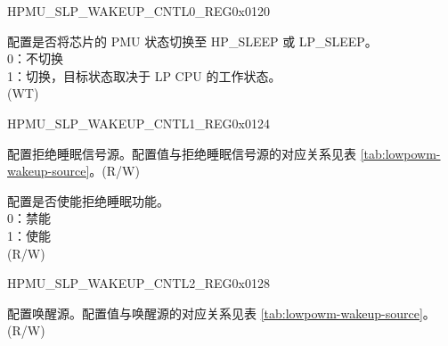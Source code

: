 \begin{register}{H}{PMU\_SLP\_WAKEUP\_CNTL0\_REG}{0x0120}\label{regdesc:PMUSLPWAKEUPCNTL0REG}
%
%
\regnewline%
\begin{regdesc}\begin{reglist}
\label{fielddesc:PMUSLEEPREQ}\item [PMU\_SLEEP\_REQ] 配置是否将芯片的 PMU 状态切换至 HP\_SLEEP 或 LP\_SLEEP。\\
0：不切换\\
1：切换，目标状态取决于 LP CPU 的工作状态。\\
(WT)
\end{reglist}\end{regdesc}
\end{register}


\begin{register}{H}{PMU\_SLP\_WAKEUP\_CNTL1\_REG}{0x0124}\label{regdesc:PMUSLPWAKEUPCNTL1REG}
%
%
\regnewline%
\begin{regdesc}\begin{reglist}
\label{fielddesc:PMUSLEEPREJECTENA}\item [PMU\_SLEEP\_REJECT\_ENA] 配置拒绝睡眠信号源。配置值与拒绝睡眠信号源的对应关系见表 \ref{tab:lowpowm-wakeup-source}。(R/W)
\label{fielddesc:PMUSLPREJECTEN}\item [PMU\_SLP\_REJECT\_EN] 配置是否使能拒绝睡眠功能。\\
0：禁能\\
1：使能\\
(R/W)
\end{reglist}\end{regdesc}
\end{register}


\begin{register}{H}{PMU\_SLP\_WAKEUP\_CNTL2\_REG}{0x0128}\label{regdesc:PMUSLPWAKEUPCNTL2REG}
%
%
\regnewline%
\begin{regdesc}\begin{reglist}
\label{fielddesc:PMUWAKEUPENA}\item [PMU\_WAKEUP\_ENA] 配置唤醒源。配置值与唤醒源的对应关系见表 \ref{tab:lowpowm-wakeup-source}。\\ (R/W)
\end{reglist}\end{regdesc}
\end{register}


